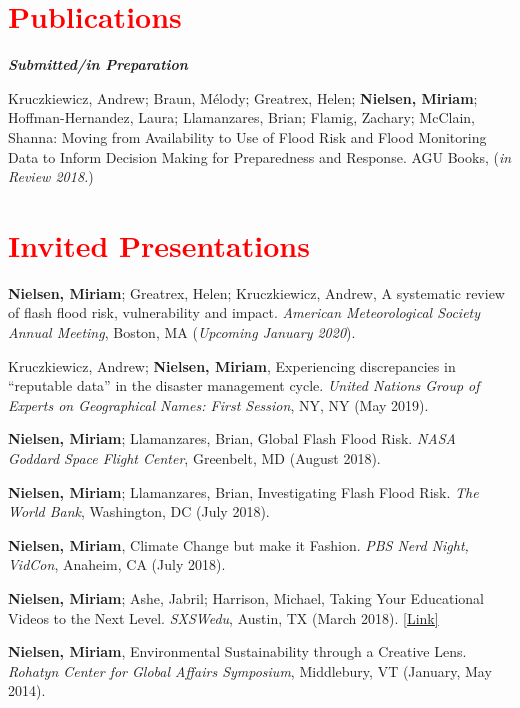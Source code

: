\documentclass[margin, line]{res}
\begin{document}
\begin{resume}
\begin{tabular}{@{}p{1 in}p{4in}}
\end{tabular}



\section{\sc \large{\textcolor{Red}{Publications}}}

\textit{\textbf{Submitted/in Preparation}}
\vspace*{-0.1in}\\
\begin{etaremune}[leftmargin=.2in,topsep=0in, parsep=0in]
\item Kruczkiewicz, Andrew; Braun, Mélody; Greatrex, Helen; \textbf{Nielsen, Miriam}; \\ Hoffman-Hernandez, Laura; Llamanzares, Brian; Flamig, Zachary; McClain, Shanna: Moving from Availability to Use of Flood Risk and Flood Monitoring Data to Inform Decision Making for Preparedness and Response. AGU Books, (\textit{in Review 2018.})
\end{etaremune}

\section{\sc \textcolor{Red}{\large{Invited Presentations}}}
\begin{etaremune}[leftmargin=.2in,topsep=0in,parsep=0in]
\item \textbf{Nielsen, Miriam}; Greatrex, Helen; Kruczkiewicz, Andrew, A systematic review of flash flood risk, vulnerability and impact. \textit{American Meteorological Society Annual Meeting}, Boston, MA (\textit{Upcoming January 2020}).
\item  Kruczkiewicz, Andrew; \textbf{Nielsen, Miriam},  Experiencing discrepancies in “reputable data” in the disaster management cycle. \textit{United Nations Group of Experts on Geographical Names: First Session}, NY, NY (May 2019). 
\item  \textbf{Nielsen, Miriam}; Llamanzares, Brian, Global Flash Flood Risk. \textit{NASA Goddard Space Flight Center}, Greenbelt, MD (August 2018). 
\item  \textbf{Nielsen, Miriam}; Llamanzares, Brian, Investigating Flash Flood Risk. \textit{The World Bank}, Washington, DC (July 2018). 
\item  \textbf{Nielsen, Miriam}, Climate Change but make it Fashion. \textit{PBS Nerd Night, VidCon}, Anaheim, CA (July 2018).
\item  \textbf{Nielsen, Miriam}; Ashe, Jabril; Harrison, Michael, Taking Your Educational Videos to the Next Level. \textit{SXSWedu}, Austin, TX (March 2018). \href{https://schedule.sxswedu.com/2018/events/PP76461"}{[Link]}
\item  \textbf{Nielsen, Miriam}, Environmental Sustainability through a Creative Lens. \textit{Rohatyn Center for Global Affairs Symposium}, Middlebury, VT (January, May 2014). 
\end{etaremune}



\end{resume}
\end{document}
